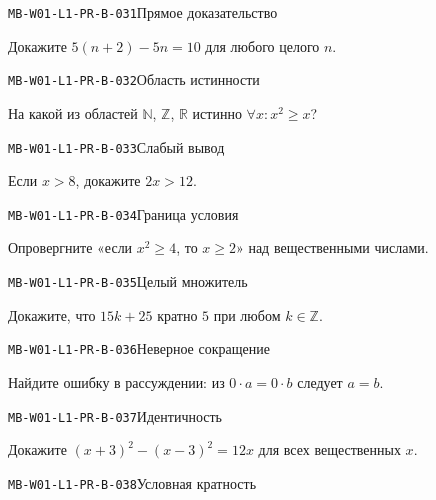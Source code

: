 \documentclass[11pt,a4paper,openany]{book}
\newcommand{\muid}[1]{\texttt{\footnotesize #1}}
\begin{document}
\noindent\hypertarget{MB-W01-L1-PR-B-031}{}\muid{MB-W01-L1-PR-B-031}\quad Прямое доказательство\par

Докажите $5(n+2)-5n=10$ для любого целого $n$.\par\medskip

\noindent\hypertarget{MB-W01-L1-PR-B-032}{}\muid{MB-W01-L1-PR-B-032}\quad Область истинности\par

На какой из областей $\mathbb N$, $\mathbb Z$, $\mathbb R$ истинно $\forall x\colon x^2\ge x$?\par\medskip

\noindent\hypertarget{MB-W01-L1-PR-B-033}{}\muid{MB-W01-L1-PR-B-033}\quad Слабый вывод\par

Если $x>8$, докажите $2x>12$.\par\medskip

\noindent\hypertarget{MB-W01-L1-PR-B-034}{}\muid{MB-W01-L1-PR-B-034}\quad Граница условия\par

Опровергните «если $x^2\ge4$, то $x\ge2$» над вещественными числами.\par\medskip

\noindent\hypertarget{MB-W01-L1-PR-B-035}{}\muid{MB-W01-L1-PR-B-035}\quad Целый множитель\par

Докажите, что $15k+25$ кратно $5$ при любом $k\in\mathbb Z$.\par\medskip

\noindent\hypertarget{MB-W01-L1-PR-B-036}{}\muid{MB-W01-L1-PR-B-036}\quad Неверное сокращение\par

Найдите ошибку в рассуждении: из $0\cdot a=0\cdot b$ следует $a=b$.\par\medskip

\noindent\hypertarget{MB-W01-L1-PR-B-037}{}\muid{MB-W01-L1-PR-B-037}\quad Идентичность\par

Докажите $(x+3)^2-(x-3)^2=12x$ для всех вещественных $x$.\par\medskip

\noindent\hypertarget{MB-W01-L1-PR-B-038}{}\muid{MB-W01-L1-PR-B-038}\quad Условная кратность\par
\end{document}
